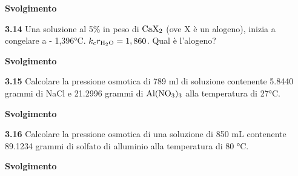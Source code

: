 \vspace{0.2cm}\large\textbf{Svolgimento}\normalsize

\vspace{0.2cm}

\vspace{0.2cm}\textbf{3.14} Una soluzione al 5\% in peso di $\rm CaX_2$ (ove X è un alogeno), inizia a congelare a - 1,396°C. $k_cr_{\rm H_2O} = 1,860$. Qual è l'alogeno? 

\vspace{0.2cm}\large\textbf{Svolgimento}\normalsize

\vspace{0.2cm}

\vspace{0.2cm}\textbf{3.15} Calcolare la pressione osmotica di 789 ml di soluzione contenente 5.8440 grammi di NaCl e  21.2996 grammi di $\rm Al(NO_3)_3$ alla temperatura di 27°C.

\vspace{0.2cm}\large\textbf{Svolgimento}\normalsize

\vspace{0.2cm}

\vspace{0.2cm}\textbf{3.16} Calcolare la pressione osmotica di una soluzione di 850 mL contenente 89.1234 grammi di solfato di alluminio alla temperatura di 80 °C.

\vspace{0.2cm}\large\textbf{Svolgimento}\normalsize

\vspace{0.2cm}

